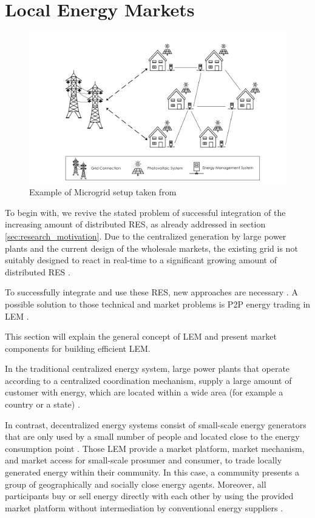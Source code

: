 \section{Local Energy Markets}
\label{sec:lem}

\begin{figure}[htbp]
	\centering
	\includegraphics[width=.9\linewidth]{./figures/microgrid_1024x.png}
	\caption{Example of Microgrid setup taken from \protect{}}
	\label{figure:microgrid}
\end{figure}

To begin with, we revive the stated problem of successful integration of the increasing amount of
distributed RES, as already addressed 
in section \ref{sec:research_motivation}. Due to the centralized generation by large power plants
and the current design of the wholesale markets, the existing grid is not suitably designed
to react in real-time to a significant growing 
amount of distributed RES  .

To successfully integrate and use these RES, new approaches are necessary .
A possible solution to those technical and market problems is P2P energy 
trading in LEM . 

This section will explain the general concept of LEM
and present market components for building efficient LEM. 

In the traditional centralized energy system, large power plants that operate according to a
centralized coordination mechanism, supply a large amount of customer with energy, which are located 
within a wide area (for example a country or a state) .

In contrast, decentralized energy systems consist of small-scale energy generators that are 
only used by a small number of people and located close to the energy consumption point .
Those LEM provide a market platform, market mechanism, and market access
for small-scale prosumer and consumer, to trade locally generated energy within their community.
In this case, a community presents a group of geographically and socially close energy agents.
Moreover, all participants buy or sell energy directly with each other by using the provided market platform
without intermediation by conventional energy suppliers .

